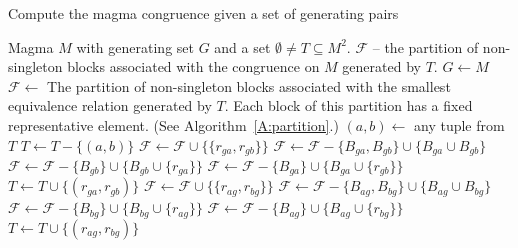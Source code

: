 \documentclass{acmconf}
\begin{document}
\begin{algorithm}[h]
\caption{Compute the magma congruence given a set of generating pairs}
\label{A:congruence}
\begin{algorithmic}[1]
\REQUIRE 
Magma $M$ with generating set $G$ and a set $\emptyset\neq T\subseteq M^2$. 
\ENSURE $\mathcal F$ -- the partition of non-singleton blocks 
associated with the congruence on $M$ generated by $T$.
        \STATE $G \leftarrow M$
\ENDIF
\STATE $\mathcal F \leftarrow$ The partition of non-singleton blocks 
associated with the 
smallest equivalence relation generated by $T$. Each block of this
partition has a fixed representative element. 
(See Algorithm~\ref{A:partition}.)
\REPEAT 
    \STATE  $(a,b)\leftarrow$ any tuple from $T$
    \STATE  $T\leftarrow T-\{(a,b)\}$
                \STATE $\mathcal F\leftarrow\mathcal F\cup \{\{r_{ga},r_{gb}\}\}$
                \STATE $\mathcal F\leftarrow\mathcal 
                           F-\{B_{ga},B_{gb}\}\cup\{B_{ga}\cup B_{gb}\}$
                \STATE $\mathcal F\leftarrow\mathcal 
                           F-\{B_{gb}\}\cup\{B_{gb}\cup\{r_{ga}\}\}$
                \STATE $\mathcal F\leftarrow\mathcal 
                           F-\{B_{ga}\}\cup\{B_{ga}\cup\{r_{gb}\}\}$
            \ENDIF
            \STATE $T\leftarrow T\cup\{(r_{ga},r_{gb})\}$
        \ENDIF
                \STATE $\mathcal F\leftarrow\mathcal F\cup \{\{r_{ag},r_{bg}\}\}$
                \STATE $\mathcal F\leftarrow\mathcal 
                           F-\{B_{ag},B_{bg}\}\cup\{B_{ag}\cup B_{bg}\}$
                \STATE $\mathcal F\leftarrow\mathcal 
                           F-\{B_{bg}\}\cup\{B_{bg}\cup\{r_{ag}\}\}$
                \STATE $\mathcal F\leftarrow\mathcal 
                           F-\{B_{ag}\}\cup\{B_{ag}\cup\{r_{bg}\}\}$
            \ENDIF
            \STATE $T\leftarrow T\cup\{(r_{ag},r_{bg})\}$

        \ENDIF
    \ENDFOR
{}
\end{algorithmic}
\end{algorithm}
\end{document}
